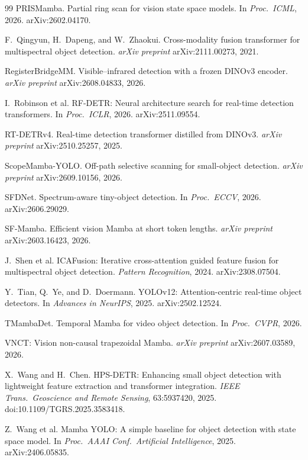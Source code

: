 \begin{thebibliography}{99}
PRISMamba. Partial ring scan for vision state space models.
In \textit{Proc.\ ICML}, 2026. arXiv:2602.04170.

F.~Qingyun, H.~Dapeng, and W.~Zhaokui.
Cross-modality fusion transformer for multispectral object detection.
\textit{arXiv preprint} arXiv:2111.00273, 2021.

RegisterBridgeMM. Visible--infrared detection with a frozen DINOv3 encoder.
\textit{arXiv preprint} arXiv:2608.04833, 2026.

I.~Robinson et al.
RF-DETR: Neural architecture search for real-time detection transformers.
In \textit{Proc.\ ICLR}, 2026. arXiv:2511.09554.

RT-DETRv4. Real-time detection transformer distilled from DINOv3.
\textit{arXiv preprint} arXiv:2510.25257, 2025.

ScopeMamba-YOLO. Off-path selective scanning for small-object detection.
\textit{arXiv preprint} arXiv:2609.10156, 2026.

SFDNet. Spectrum-aware tiny-object detection.
In \textit{Proc.\ ECCV}, 2026. arXiv:2606.29029.

SF-Mamba. Efficient vision Mamba at short token lengths.
\textit{arXiv preprint} arXiv:2603.16423, 2026.

J.~Shen et al.
ICAFusion: Iterative cross-attention guided feature fusion for multispectral
object detection. \textit{Pattern Recognition}, 2024. arXiv:2308.07504.

Y.~Tian, Q.~Ye, and D.~Doermann.
YOLOv12: Attention-centric real-time object detectors.
In \textit{Advances in NeurIPS}, 2025. arXiv:2502.12524.

TMambaDet. Temporal Mamba for video object detection.
In \textit{Proc.\ CVPR}, 2026.

VNCT: Vision non-causal trapezoidal Mamba.
\textit{arXiv preprint} arXiv:2607.03589, 2026.

X.~Wang and H.~Chen.
HPS-DETR: Enhancing small object detection with lightweight feature
extraction and transformer integration.
\textit{IEEE Trans.\ Geoscience and Remote Sensing}, 63:5937420, 2025.
doi:10.1109/TGRS.2025.3583418.

Z.~Wang et al.
Mamba YOLO: A simple baseline for object detection with state space model.
In \textit{Proc.\ AAAI Conf.\ Artificial Intelligence}, 2025. arXiv:2406.05835.


\end{thebibliography}
